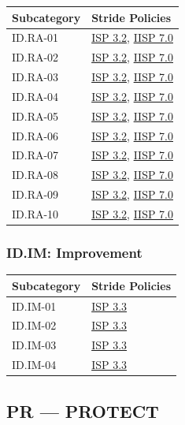 \documentclass[11pt,landscape]{article}
\begin{document}
\begin{tabularx}{\textwidth}{|p{3.5cm}|X|}
\hline
\rowcolor{headgray} \textbf{Subcategory} & \textbf{Stride Policies} \\
\hline
ID.RA-01 & \hyperref[pol:ISP32]{ISP 3.2}, \hyperref[pol:IISP70]{IISP 7.0} \\
\hline
ID.RA-02 & \hyperref[pol:ISP32]{ISP 3.2}, \hyperref[pol:IISP70]{IISP 7.0} \\
\hline
ID.RA-03 & \hyperref[pol:ISP32]{ISP 3.2}, \hyperref[pol:IISP70]{IISP 7.0} \\
\hline
ID.RA-04 & \hyperref[pol:ISP32]{ISP 3.2}, \hyperref[pol:IISP70]{IISP 7.0} \\
\hline
ID.RA-05 & \hyperref[pol:ISP32]{ISP 3.2}, \hyperref[pol:IISP70]{IISP 7.0} \\
\hline
ID.RA-06 & \hyperref[pol:ISP32]{ISP 3.2}, \hyperref[pol:IISP70]{IISP 7.0} \\
\hline
ID.RA-07 & \hyperref[pol:ISP32]{ISP 3.2}, \hyperref[pol:IISP70]{IISP 7.0} \\
\hline
ID.RA-08 & \hyperref[pol:ISP32]{ISP 3.2}, \hyperref[pol:IISP70]{IISP 7.0} \\
\hline
ID.RA-09 & \hyperref[pol:ISP32]{ISP 3.2}, \hyperref[pol:IISP70]{IISP 7.0} \\
\hline
ID.RA-10 & \hyperref[pol:ISP32]{ISP 3.2}, \hyperref[pol:IISP70]{IISP 7.0} \\
\hline
\end{tabularx}

\subsubsection{ID.IM: Improvement}

\begin{tabularx}{\textwidth}{|p{3.5cm}|X|}
\hline
\rowcolor{headgray} \textbf{Subcategory} & \textbf{Stride Policies} \\
\hline
ID.IM-01 & \hyperref[pol:ISP33]{ISP 3.3} \\
\hline
ID.IM-02 & \hyperref[pol:ISP33]{ISP 3.3} \\
\hline
ID.IM-03 & \hyperref[pol:ISP33]{ISP 3.3} \\
\hline
ID.IM-04 & \hyperref[pol:ISP33]{ISP 3.3} \\
\hline
\end{tabularx}

\subsection{PR --- PROTECT}
\end{document}
